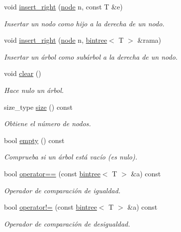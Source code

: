 \begin{DoxyCompactItemize}
void \hyperlink{classbintree_a8f25464ce656370a6ab5d56ac56a3b5e}{insert\-\_\-right} (\hyperlink{classbintree_1_1node}{node} n, const T \&e)
\begin{DoxyCompactList}\small\item\em Insertar un nodo como hijo a la derecha de un nodo. \end{DoxyCompactList}\item 
void \hyperlink{classbintree_a01c798112c64624e3e90ed027bfd76e1}{insert\-\_\-right} (\hyperlink{classbintree_1_1node}{node} n, \hyperlink{classbintree}{bintree}$<$ T $>$ \&rama)
\begin{DoxyCompactList}\small\item\em Insertar un árbol como subárbol a la derecha de un nodo. \end{DoxyCompactList}\item 
void \hyperlink{classbintree_a2078f7f9254a84b592fdb1f2e2f9238a}{clear} ()
\begin{DoxyCompactList}\small\item\em Hace nulo un árbol. \end{DoxyCompactList}\item 
size\-\_\-type \hyperlink{classbintree_a05abb18037587082a67fb4d4d2f5733f}{size} () const 
\begin{DoxyCompactList}\small\item\em Obtiene el número de nodos. \end{DoxyCompactList}\item 
bool \hyperlink{classbintree_a772126c3e8b7cd37e5a93ccbda01f8dd}{empty} () const 
\begin{DoxyCompactList}\small\item\em Comprueba si un árbol está vacío (es nulo). \end{DoxyCompactList}\item 
bool \hyperlink{classbintree_a29438cd817b1d27ccc10d46676ba6bef}{operator==} (const \hyperlink{classbintree}{bintree}$<$ T $>$ \&a) const 
\begin{DoxyCompactList}\small\item\em Operador de comparación de igualdad. \end{DoxyCompactList}\item 
bool \hyperlink{classbintree_a80e397f887ebad1ef974ec7722430a6c}{operator!=} (const \hyperlink{classbintree}{bintree}$<$ T $>$ \&a) const 
\begin{DoxyCompactList}\small\item\em Operador de comparación de desigualdad. \end{DoxyCompactList}\item 

\end{DoxyCompactItemize}
